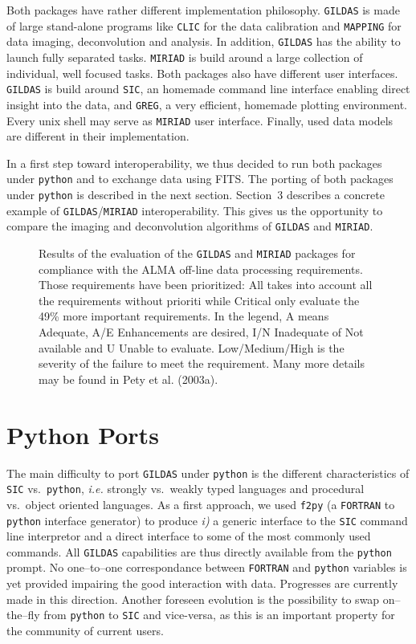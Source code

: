 \documentclass[11pt,twoside]{article}  %
\newcommand{\FORTRAN}{\texttt{FORTRAN}}
\newcommand{\GILDAS}{\texttt{GILDAS}}
\newcommand{\MIRIAD}{\texttt{MIRIAD}}
\newcommand{\python}{\texttt{python}}
\newcommand{\fpig}{\texttt{f2py}}
\newcommand{\SIC}{\texttt{SIC}}
\newcommand{\GREG}{\texttt{GREG}}
\newcommand{\CLIC}{\texttt{CLIC}}
\newcommand{\MAPPING}{\texttt{MAPPING}}
\newcommand{\ALMA}{\textrm{ALMA}}
\newcommand{\ie} {{\em i.e.}}
\begin{document}
Both packages have rather different implementation philosophy. \GILDAS{} is
made of large stand-alone programs like \CLIC{} for the data calibration
and \MAPPING{} for data imaging, deconvolution and analysis. In addition,
\GILDAS{} has the ability to launch fully separated tasks. \MIRIAD{} is
build around a large collection of individual, well focused tasks.  Both
packages also have different user interfaces. \GILDAS{} is build around
\SIC{}, an homemade command line interface enabling direct insight into the
data, and \GREG{}, a very efficient, homemade plotting environment. Every
unix shell may serve as \MIRIAD{} user interface. Finally, used data models
are different in their implementation.

In a first step toward interoperability, we thus decided to run both
packages under \python{} and to exchange data using FITS.  The porting of both
packages under \python{} is described in the next section. Section~3 describes
a concrete example of \GILDAS{}/\MIRIAD{} interoperability. This gives us
the opportunity to compare the imaging and deconvolution algorithms of
\GILDAS{} and \MIRIAD{}.

\begin{figure}
  \centering
  \caption{Results of the evaluation of the \GILDAS{} and \MIRIAD{}
    packages for compliance with the \ALMA{} off-line data processing
    requirements. Those requirements have been prioritized: All takes into
    account all the requirements without prioriti while Critical only
    evaluate the 49\% more important requirements. In the legend, A means
    Adequate, A/E Enhancements are desired, I/N Inadequate of Not available
    and U Unable to evaluate.  Low/Medium/High is the severity of the
    failure to meet the requirement.  Many more details may be found in
    Pety et al. (2003a).}
  \label{fig:P4-14_1}
\end{figure}

\section{Python Ports}

The main difficulty to port \GILDAS{} under \python{} is the different
characteristics of \SIC{} vs.\ \python{}, \ie{} strongly vs.\ weakly typed
languages and procedural vs.\ object oriented languages. As a first
approach, we used \fpig{} (a \FORTRAN{} to \python{} interface generator)
to produce \emph{i)} a generic interface to the \SIC{} command line
interpretor and a direct interface to some of the most commonly used
commands. All \GILDAS{} capabilities are thus directly available from the
\python{} prompt. No one--to--one correspondance between \FORTRAN{} and
\python{} variables is yet provided impairing the good interaction with
data. Progresses are currently made in this direction. Another foreseen
evolution is the possibility to swap on--the--fly from \python{} to \SIC{}
and vice-versa, as this is an important property for the community of
current users.
\end{document}
